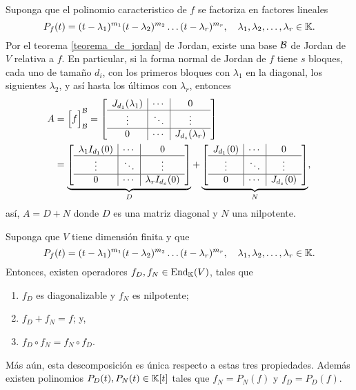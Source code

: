 Suponga que el polinomio caracteristico de $f$ se factoriza en factores lineales
\[
P_f(t)=(t-\lambda_1)^{m_1}(t-\lambda_2)^{m_2}\ldots(t-\lambda_r)^{m_r}, \quad \lambda_1,\lambda_2,\ldots,\lambda_r\in \mathbb{K}.
\]
Por el teorema \ref{teorema_de_jordan} de Jordan, existe una base $\mathcal{B}$ de Jordan de $V$ relativa a $f$. En particular, si la forma normal de Jordan de $f$ tiene $s$ bloques, cada uno de tamaño $d_i$, con los primeros bloques con $\lambda_1$ en la diagonal, los siguientes $\lambda_2$, y así hasta los últimos con $\lambda_r$, entonces
\begin{align*}
  A & =\Big[f\Big]^{\mathcal{B}}_{\mathcal{B}}=
  \left[\begin{array}{c|c|c}
    J_{d_1}(\lambda_1) & \cdots & 0\\
    \hline
    \vdots & \ddots & \vdots\\
    \hline
    0 & \cdots & J_{d_s}(\lambda_r)
  \end{array}\right]\\
   & =
  \underbrace{\left[\begin{array}{c|c|c}
    \lambda_1I_{d_1}(0) & \cdots & 0\\
    \hline
    \vdots & \ddots & \vdots\\
    \hline
    0 & \cdots & \lambda_rI_{d_s}(0)
  \end{array}\right]}_D+
  \underbrace{\left[\begin{array}{c|c|c}
    J_{d_1}(0) & \cdots & 0\\
    \hline
    \vdots & \ddots & \vdots\\
    \hline
    0 & \cdots & J_{d_s}(0)
  \end{array}\right]}_N,
\end{align*}
así, $A=D+N$ donde $D$ es una matriz diagonal y $N$ una nilpotente.

\begin{teo}\label{descjorche}
  Suponga que $V$ tiene dimensi\'on finita y que
  \[
  P_f(t)=(t-\lambda_1)^{m_1}(t-\lambda_2)^{m_2}\ldots(t-\lambda_r)^{m_r}, \quad \lambda_1,\lambda_2,\ldots,\lambda_r\in \mathbb{K}.
  \]
  Entonces, existen operadores $f_D,f_N\in\operatorname{End}_{\mathbb{K}}(V)$, tales que
  \begin{enumerate}
  \item $f_D$ es diagonalizable y $f_N$ es nilpotente;
  \item $f_D+f_N=f$; y,
  \item $f_D\circ f_N=f_N\circ f_D$.
  \end{enumerate}
  M\'as a\'un, esta descomposici\'on es \'unica respecto a estas tres propiedades. Adem\'as existen polinomios $P_D(t),P_N(t)\in \mathbb{K}[t]$ tales que $f_N=P_N(f)$ y $f_D=P_D(f)$.
\end{teo}
  
